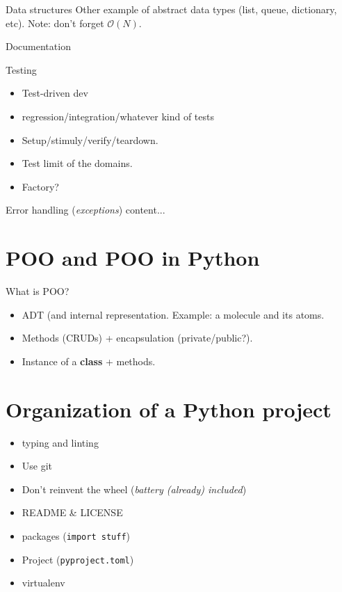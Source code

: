 \documentclass[10pt,
]{beamer}
\begin{document}
\begin{frame}{Data structures}
Other example of abstract data types (list, queue, dictionary, etc).
Note: don't forget $\mathcal O(N)$.
\end{frame}

\begin{frame}{Documentation}
\end{frame}

\begin{frame}{Testing}
	\begin{itemize}
		\item Test-driven dev
		\item regression/integration/whatever kind of tests
		\item Setup/stimuly/verify/teardown.
		\item Test limit of the domains.
		\item Factory?
	\end{itemize}
\end{frame}

\begin{frame}{Error handling (\textit{exceptions})}
	content...
\end{frame}

 \section{POO and POO in Python}
 
 \begin{frame}{What is POO?}
 	\begin{itemize}
 		\item ADT (and internal representation. Example: a molecule and its atoms.
 		\item Methods (CRUDs)  + encapsulation (private/public?).
 		\item Instance of a \textbf{class} + methods.
 	\end{itemize}
 \end{frame}
 
 \section{Organization of a Python project}
 
 \begin{frame}
 	\begin{itemize}
 		\item typing and linting
 		\item Use git
 		\item Don't reinvent the wheel (\textit{battery (already) included})
 		\item README \& LICENSE
 		\item packages (\texttt{import stuff})
 		\item Project (\texttt{pyproject.toml})
 		\item virtualenv
 	\end{itemize}
 \end{frame}
\end{document}
